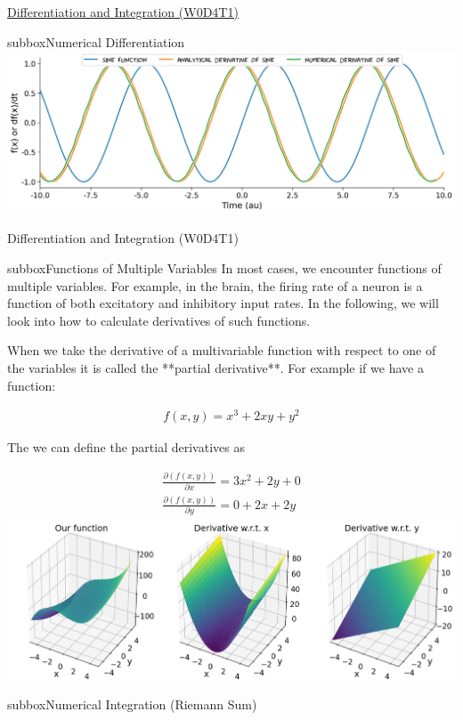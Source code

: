 \begin{multicols}{3}
\begin{textbox}{\href{https://compneuro.neuromatch.io/tutorials/W0D4_Calculus/student/W0D4_Tutorial1.html}{Differentiation and Integration (W0D4T1)}  }
\begin{subbox}{subbox}{Numerical Differentiation}
\centering
\includegraphics[scale=0.13]{Figures/PreCourse/CFigure2.png}
\end{subbox}
\end{textbox}
\begin{textbox}{Differentiation and Integration (W0D4T1) }
\begin{subbox}{subbox}{Functions of Multiple Variables}
\scriptsize
In most cases, we encounter functions of multiple variables. For example, in the brain, the firing rate of a neuron is a function of both excitatory and inhibitory input rates. In the following, we will look into how to calculate derivatives of such functions.

When we take the derivative of a multivariable function with respect to one of the variables it is called the **partial derivative**. For example if we have a function:

\begin{align}
f(x,y) = x^3  +2xy+ y^2
\end{align}

The we can define the partial derivatives as

\begin{align}
\frac{\partial(f(x,y))}{\partial x} = 3x^2  +2y+ 0 \\
\frac{\partial(f(x,y))}{\partial y} = 0+ 2x+2y
\end{align}
\centering
\includegraphics[scale=0.2]{Figures/PreCourse/CFigure3.png}

\end{subbox}
\begin{subbox}{subbox}{Numerical Integration (Riemann Sum)}
\scriptsize


\end{subbox}
\end{textbox}
\end{multicols}
